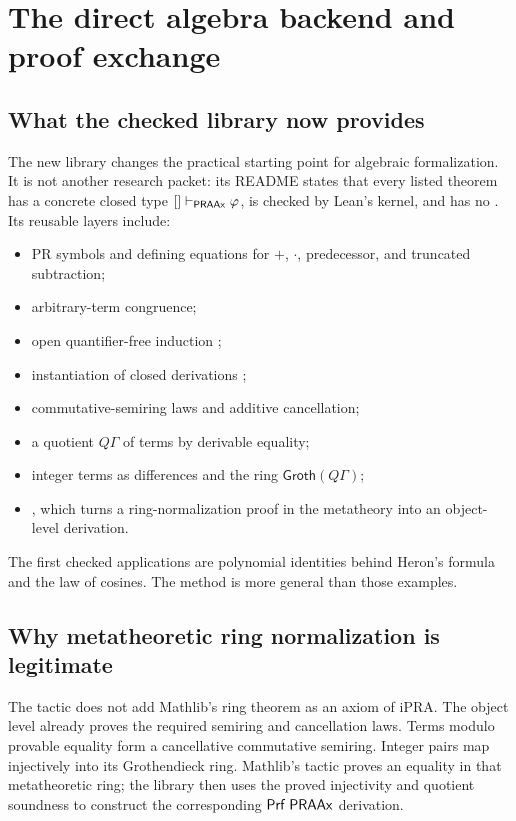 \section{The direct algebra backend and proof exchange}

\subsection{What the checked library now provides}

The new  library changes
the practical starting point for algebraic formalization.  It is not another
research packet: its README states that every listed theorem has a concrete
closed type \([]\vdash_{\mathsf{PRAAx}}\varphi\), is checked by Lean's kernel, and has no
.  Its reusable layers include:

\begin{itemize}
\item PR symbols and defining equations for \(+\), \(\cdot\), predecessor, and
truncated subtraction;
\item arbitrary-term congruence;
\item open quantifier-free induction ;
\item instantiation of closed derivations ;
\item commutative-semiring laws and additive cancellation;
\item a quotient \(Q\Gamma\) of terms by derivable equality;
\item integer terms as differences and the ring \(\mathsf{Groth}(Q\Gamma)\);
\item {}, which turns a ring-normalization proof in the
metatheory into an object-level derivation.
\end{itemize}

The first checked applications are polynomial identities behind Heron's formula
and the law of cosines.  The method is more general than those examples.

\subsection{Why metatheoretic ring normalization is legitimate}

The tactic does not add Mathlib's ring theorem as an axiom of iPRA.  The object
level already proves the required semiring and cancellation laws.  Terms modulo
provable equality form a cancellative commutative semiring.  Integer pairs map
injectively into its Grothendieck ring.  Mathlib's  tactic proves an
equality in that metatheoretic ring; the library then uses the proved
injectivity and quotient soundness to construct the corresponding
\(\mathsf{Prf}\;\mathsf{PRAAx}\) derivation.

